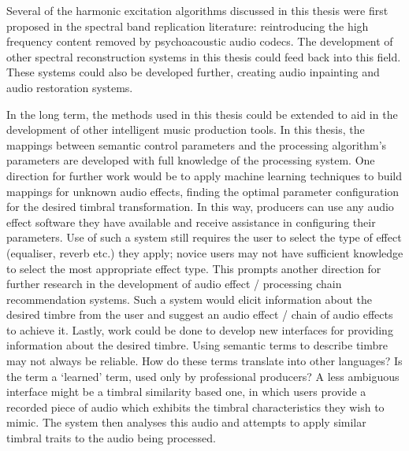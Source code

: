 	Several of the harmonic excitation algorithms discussed in this thesis were first proposed in the spectral band
	replication literature: reintroducing the high frequency content removed by psychoacoustic audio codecs. The
	development of other spectral reconstruction systems in this thesis could feed back into this field. These systems
	could also be developed further, creating audio inpainting and audio restoration systems.

	In the long term, the methods used in this thesis could be extended to aid in the development of other intelligent
	music production tools. In this thesis, the mappings between semantic control parameters and the processing
	algorithm's parameters are developed with full knowledge of the processing system. One direction for further work
	would be to apply machine learning techniques to build mappings for unknown audio effects, finding the optimal
	parameter configuration for the desired timbral transformation. In this way, producers can use any audio effect
	software they have available and receive assistance in configuring their parameters. Use of such a system still
	requires the user to select the type of effect (equaliser, reverb etc.) they apply; novice users may not have
	sufficient knowledge to select the most appropriate effect type. This prompts another direction for further research
	in the development of audio effect / processing chain recommendation systems. Such a system would elicit information
	about the desired timbre from the user and suggest an audio effect / chain of audio effects to achieve it. Lastly,
	work could be done to develop new interfaces for providing information about the desired timbre. Using semantic
	terms to describe timbre may not always be reliable. How do these terms translate into other languages? Is the term
	a `learned' term, used only by professional producers? A less ambiguous interface might be a timbral similarity
	based one, in which users provide a recorded piece of audio which exhibits the timbral characteristics they wish to
	mimic.  The system then analyses this audio and attempts to apply similar timbral traits to the audio being
	processed.
